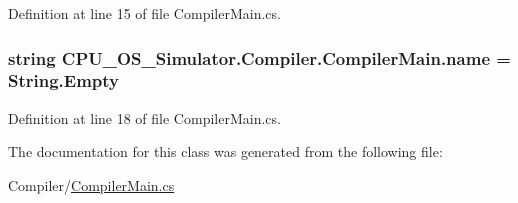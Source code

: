 Definition at line 15 of file Compiler\+Main.\+cs.

\hypertarget{class_c_p_u___o_s___simulator_1_1_compiler_1_1_compiler_main_a39370e54e39a32c7eb9dce2f9b49cefe}{}
\subsubsection[{name}]{\setlength{\rightskip}{0pt plus 5cm}string C\+P\+U\+\_\+\+O\+S\+\_\+\+Simulator.\+Compiler.\+Compiler\+Main.\+name = String.\+Empty\hspace{0.3cm}{\ttfamily [private]}}\label{class_c_p_u___o_s___simulator_1_1_compiler_1_1_compiler_main_a39370e54e39a32c7eb9dce2f9b49cefe}


Definition at line 18 of file Compiler\+Main.\+cs.



The documentation for this class was generated from the following file\+:\begin{DoxyCompactItemize}
\item 
Compiler/\hyperlink{_compiler_main_8cs}{Compiler\+Main.\+cs}\end{DoxyCompactItemize}
